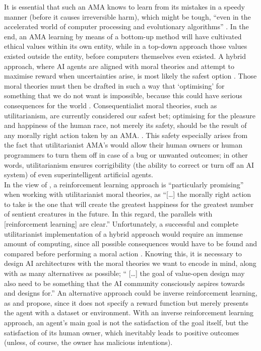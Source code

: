 \documentclass[final]{clv3} %
\begin{document}
It is essential that such an AMA knows to learn from its mistakes in a speedy manner (before it causes irreversible harm), which might be tough, “even in the accelerated world of computer processing and evolutionary algorithms” \cite[p. 151]{allen2005}. In the end, an AMA learning by means of a bottom-up method will have cultivated ethical values within its own entity, while in a top-down approach those values existed outside the entity, before computers themselves even existed. A hybrid approach, where AI agents are aligned with moral theories and attempt to maximise reward when uncertainties arise, is most likely the safest option \cite{gabriel}. Those moral theories must then be drafted in such a way that ‘optimising’ for something that we do not want is impossible, because this could have serious consequences for the world \cite{bostrom}. Consequentialist moral theories, such as utilitarianism, are currently considered our safest bet; optimising for the pleasure and happiness of the human race, not merely its safety, should be the result of any morally right action taken by an AMA. \cite{gabriel}. This safety especially arises from the fact that utilitarianist AMA’s would allow their human owners or human programmers to turn them off in case of a bug or unwanted outcomes; in other words, utilitarianism ensures corrigibility (the ability to correct or turn off an AI system) \cite{soares} of even superintelligent artificial agents.\\

In the view of \citet[p. 4]{gabriel}, a reinforcement learning approach is “particularly promising” when working with utilitarianist moral theories, as “[…] the morally right action to take is the one that will create the greatest happiness for the greatest number of sentient creatures in the future. In this regard, the parallels with [reinforcement learning] are clear.” Unfortunately, a successful and complete utilitarianist implementation of a hybrid approach would require an immense amount of computing, since all possible consequences would have to be found and compared before performing a moral action \cite{allen2005}. Knowing this, it is necessary to design AI architectures with the moral theories we want to encode in mind, along with as many alternatives as possible; “ […] the goal of value-open design may also need to be something that the AI community consciously aspires towards and designs for.” \cite[p. 5]{gabriel} An alternative approach could be inverse reinforcement learning, as \citet{gabriel} and \citet{tegmark} propose, since it does not specify a reward function but merely presents the agent with a dataset or environment. With an inverse reinforcement learning approach, an agent’s main goal is not the satisfaction of the goal itself, but the satisfaction of its human owner, which inevitably leads to positive outcomes (unless, of course, the owner has malicious intentions). \\
\end{document}
